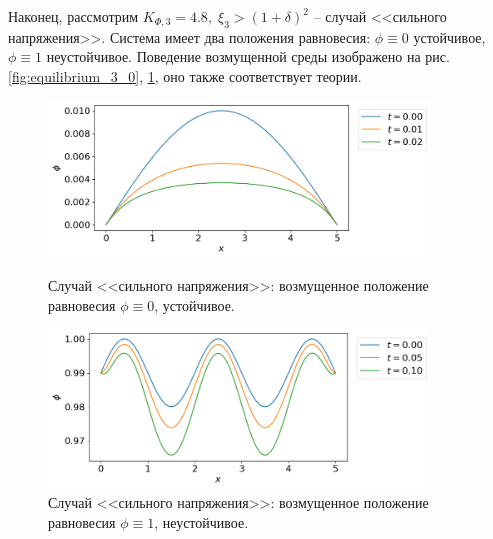 Наконец, рассмотрим $K_{\Phi, 3} = 4.8, \; \xi_3 > (1 + \delta)^2$ -- случай <<сильного напряжения>>. Система имеет два положения равновесия: $\phi \equiv 0$ устойчивое, $\phi \equiv 1$ неустойчивое. Поведение возмущенной среды изображено на рис. \ref{fig:equilibrium_3_0}, \ref{fig:equilibrium_3_1}, оно также соответствует теории.

\begin{figure}[!t]
    \centering
    \includegraphics[width=0.9\textwidth]{figures/equilibrium_3_0.png}
    \vspace{-0.3cm}
    \caption{Случай <<сильного напряжения>>: возмущенное положение равновесия $\phi \equiv 0$, устойчивое.}
    \label{fig:equilibrium_3_0}
    \vspace{0.5cm}
    
    \includegraphics[width=0.9\textwidth]{figures/equilibrium_3_1.png}
    \vspace{-0.3cm}
    \caption{Случай <<сильного напряжения>>: возмущенное положение равновесия $\phi \equiv 1$, неустойчивое.}
    \label{fig:equilibrium_3_1}
\end{figure}